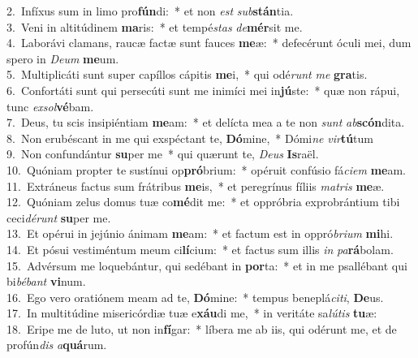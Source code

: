 {2.~}Infíxus sum in limo pro\textbf{fún}di:~* et non \textit{est} \textit{sub}\textbf{stán}tia.\\
{3.~}Veni in altitúdinem \textbf{ma}ris:~* et tempé\textit{stas} \textit{de}\textbf{mér}sit me.\\
{4.~}Laborávi clamans, raucæ factæ sunt fauces \textbf{me}æ:~* defecérunt óculi mei, dum spero in \textit{De}\textit{um} \textbf{me}um.\\
{5.~}Multiplicáti sunt super capíllos cápitis \textbf{me}i,~* qui odé\textit{runt} \textit{me} \textbf{gra}tis.\\
{6.~}Confortáti sunt qui persecúti sunt me inimíci mei in\textbf{jú}ste:~* quæ non rápui, tunc \textit{ex}\textit{sol}\textbf{vé}bam.\\
{7.~}Deus, tu scis insipiéntiam \textbf{me}am:~* et delícta mea a te non \textit{sunt} \textit{ab}\textbf{scón}dita.\\
{8.~}Non erubéscant in me qui exspéctant te, \textbf{Dó}mine,~* Dómi\textit{ne} \textit{vir}\textbf{tú}tum\\
{9.~}Non confundántur \textbf{su}per me~* qui quærunt te, \textit{De}\textit{us} \textbf{Is}raël.\\
{10.~}Quóniam propter te sustínui op\textbf{pró}brium:~* opéruit confúsio fá\textit{ci}\textit{em} \textbf{me}am.\\
{11.~}Extráneus factus sum frátribus \textbf{me}is,~* et peregrínus fíliis \textit{ma}\textit{tris} \textbf{me}æ.\\
{12.~}Quóniam zelus domus tuæ co\textbf{mé}dit me:~* et oppróbria exprobrántium tibi ceci\textit{dé}\textit{runt} \textbf{su}per me.\\
{13.~}Et opérui in jejúnio ánimam \textbf{me}am:~* et factum est in oppró\textit{bri}\textit{um} \textbf{mi}hi.\\
{14.~}Et pósui vestiméntum meum ci\textbf{lí}cium:~* et factus sum illis \textit{in} \textit{pa}\textbf{rá}bolam.\\
{15.~}Advérsum me loquebántur, qui sedébant in \textbf{por}ta:~* et in me psallébant qui bi\textit{bé}\textit{bant} \textbf{vi}num.\\
{16.~}Ego vero oratiónem meam ad te, \textbf{Dó}mine:~* tempus beneplá\textit{ci}\textit{ti}, \textbf{De}us.\\
{17.~}In multitúdine misericórdiæ tuæ e\textbf{xáu}di me,~* in veritáte sa\textit{lú}\textit{tis} \textbf{tu}æ:\\
{18.~}Eripe me de luto, ut non in\textbf{fí}gar:~* líbera me ab iis, qui odérunt me, et de profún\textit{dis} \textit{a}\textbf{quá}rum.\\
